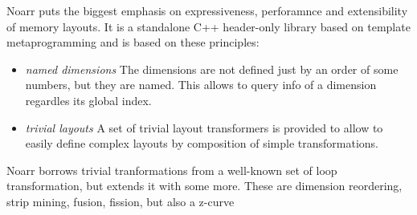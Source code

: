 Noarr puts the biggest emphasis on expressiveness, perforamnce and extensibility of memory layouts. It is a standalone C++ header-only library based on template metaprogramming and is based on these principles:
\begin{itemize}
  \item \emph{named dimensions} The dimensions are not defined just by an order of some numbers, but they are named. This allows to query info of a dimension regardles its global index.
  \item \emph{trivial layouts} A set of trivial layout transformers is provided to allow to easily define complex layouts by composition of simple transformations.
\end{itemize}

Noarr borrows trivial tranformations from a well-known set of loop transformation, but extends it with some more. These are dimension reordering, 
strip mining, fusion, fission, but also a z-curve

